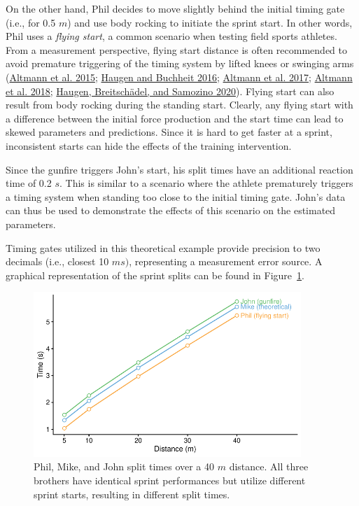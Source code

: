 \documentclass[
  letterpaper,
  DIV=11,
  numbers=noendperiod]{scrartcl}
\begin{document}
On the other hand, Phil decides to move slightly behind the initial
timing gate (i.e., for 0.5 \(m\)) and use body rocking to initiate the
sprint start. In other words, Phil uses a \emph{flying start}, a common
scenario when testing field sports athletes. From a measurement
perspective, flying start distance is often recommended to avoid
premature triggering of the timing system by lifted knees or swinging
arms
(\protect\hyperlink{ref-altmannDifferentStartingDistances2015}{Altmann
et al. 2015};
\protect\hyperlink{ref-haugenSprintRunningPerformance2016}{Haugen and
Buchheit 2016};
\protect\hyperlink{ref-altmannValiditySingleBeamTiming2017}{Altmann et
al. 2017}; \protect\hyperlink{ref-altmannAccuracySingleBeam2018}{Altmann
et al. 2018};
\protect\hyperlink{ref-haugenPowerForceVelocityProfilingSprinting2020}{Haugen,
Breitschädel, and Samozino 2020}). Flying start can also result from
body rocking during the standing start. Clearly, any flying start with a
difference between the initial force production and the start time can
lead to skewed parameters and predictions. Since it is hard to get
faster at a sprint, inconsistent starts can hide the effects of the
training intervention.

Since the gunfire triggers John's start, his split times have an
additional reaction time of 0.2 \(s\). This is similar to a scenario
where the athlete prematurely triggers a timing system when standing too
close to the initial timing gate. John's data can thus be used to
demonstrate the effects of this scenario on the estimated parameters.

Timing gates utilized in this theoretical example provide precision to
two decimals (i.e., closest 10 \(ms)\), representing a measurement error
source. A graphical representation of the sprint splits can be found in
Figure~\ref{fig-mike-phil-john-split-times}.

\begin{figure}

{\centering \includegraphics[width=0.9\textwidth,height=\textheight]{shorts-simulation-paper_files/figure-pdf/fig-mike-phil-john-split-times-1.pdf}

}

\caption{\label{fig-mike-phil-john-split-times}Phil, Mike, and John
split times over a 40 \(m\) distance. All three brothers have identical
sprint performances but utilize different sprint starts, resulting in
different split times.}

\end{figure}
\end{document}
